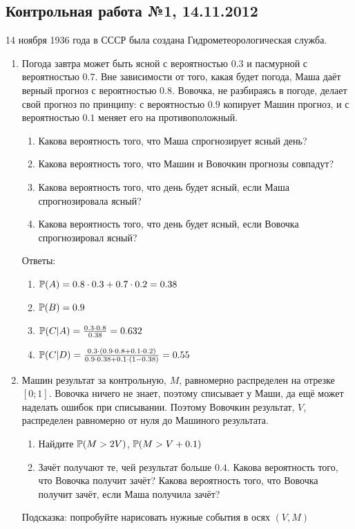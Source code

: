 \documentclass[12pt, a4paper]{article}\usepackage[]{graphicx}\usepackage[]{color}
\begin{document}
				\subsection{Контрольная работа №1, 14.11.2012}




				\vspace{20pt}
				14 ноября 1936 года в СССР была создана Гидрометеорологическая служба.
				\vspace{20pt}

				\begin{enumerate}

					\item Погода завтра может быть ясной с вероятностью $0.3$ и пасмурной с вероятностью $0.7$. Вне зависимости от того, какая будет погода, Маша даёт верный прогноз с вероятностью $0.8$. Вовочка, не разбираясь в погоде, делает свой прогноз по принципу: с вероятностью $0.9$ копирует Машин прогноз, и с вероятностью $0.1$ меняет его на противоположный.
					\begin{enumerate}
						\item Какова вероятность того, что Маша спрогнозирует ясный день?
						\item Какова вероятность того, что Машин и Вовочкин прогнозы совпадут?
						\item Какова вероятность того, что день будет ясный, если Маша спрогнозировала ясный?
						\item Какова вероятность того, что день будет ясный, если Вовочка спрогнозировал ясный?
					\end{enumerate}

					Ответы:
					\begin{enumerate}
						\item $\P(A)=0.8\cdot 0.3+0.7\cdot 0.2=0.38$
						\item $\P(B)=0.9$
						\item $\P(C|A)=\frac{0.3\cdot 0.8}{0.38}=0.632$
						\item $\P(C|D)=\frac{0.3\cdot (0.9\cdot 0.8+0.1\cdot 0.2)}{0.9\cdot 0.38+0.1\cdot (1-0.38)}=0.55$
					\end{enumerate}


					\item Машин результат за контрольную, $M$, равномерно распределен на отрезке $[0;1]$. Вовочка ничего не знает, поэтому списывает у Маши, да ещё может наделать ошибок при списывании. Поэтому Вовочкин результат, $V$, распределен равномерно от нуля до Машиного результата.
					\begin{enumerate}
						\item Найдите $\P(M>2V)$, $\P(M>V+0.1)$
						\item Зачёт получают те, чей результат больше $0.4$. Какова вероятность того, что Вовочка получит зачёт? Какова вероятность того, что Вовочка получит зачёт, если Маша получила зачёт?
					\end{enumerate}
					Подсказка: попробуйте нарисовать нужные события в осях $(V,M)$


\end{enumerate}
\end{document}
